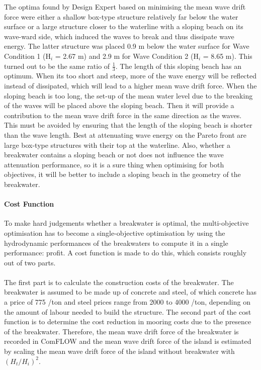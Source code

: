 The optima found by Design Expert based on minimising the mean wave drift force were either a shallow box-type structure relatively far below the water surface or a large structure closer to the waterline with a sloping beach on its wave-ward side, which induced the waves to break and thus dissipate wave energy. The latter structure was placed 0.9 m below the water surface for Wave Condition 1 (H$_i$ = 2.67 m) and 2.9 m for Wave Condition 2 (H$_i$ = 8.65 m). This turned out to be the same ratio of $\frac{1}{3}$. The length of this sloping beach has an optimum. When its too short and steep, more of the wave energy will be reflected instead of dissipated, which will lead to a higher mean wave drift force. When the sloping beach is too long, the set-up of the mean water level due to the breaking of the waves will be placed above the sloping beach. Then it will provide a contribution to the mean wave drift force in the same direction as the waves. This must be avoided by ensuring that the length of the sloping beach is shorter than the wave length. Best at attenuating wave energy on the Pareto front are large box-type structures with their top at the waterline. Also, whether a breakwater contains a sloping beach or not does not influence the wave attenuation performance, so it is a sure thing when optimising for both objectives, it will be better to include a sloping beach in the geometry of the breakwater.





\paragraph{Cost Function}
To make hard judgements whether a breakwater is optimal, the multi-objective optimisation has to become a single-objective optimisation by using the hydrodynamic performances of the breakwaters to compute it in a single performance: profit. A cost function is made to do this, which consists roughly out of two parts.\\
\\
The first part is to calculate the construction costs of the breakwater. The breakwater is assumed to be made up of concrete and steel, of which concrete has a price of 775 \texteuro/ton and steel prices range from 2000 to 4000 \texteuro/ton, depending on the amount of labour needed to build the structure. The second part of the cost function is to determine the cost reduction in mooring costs due to the presence of the breakwater. Therefore, the mean wave drift force of the breakwater is recorded in ComFLOW and the mean wave drift force of the island is estimated by scaling the mean wave drift force of the island without breakwater with $(H_t/H_i)^2$.



